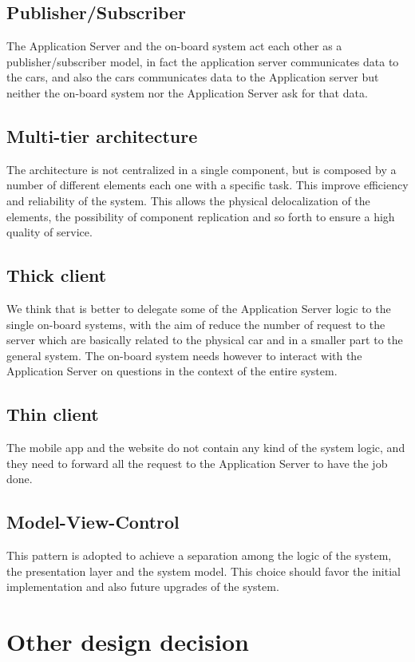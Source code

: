 \documentclass{scrreprt}
\begin{document}
\subsection{Publisher/Subscriber}
The Application Server and the on-board system act each other as a publisher/subscriber model, in fact the application server communicates data to the cars, and also the cars communicates data to the Application server but neither the on-board system nor the Application Server ask for that data.


\subsection{Multi-tier architecture}
The architecture is not centralized in a single component, but is composed by a number of different elements each one with a specific task. This improve efficiency and reliability of the system. This allows the physical delocalization of the elements, the possibility of component replication and so forth to ensure a high quality of service.

\subsection{Thick client}
We think that is better to delegate some of the Application Server logic to the single on-board systems, with the aim of reduce the number of request to the server which are basically related to the physical car and in a smaller part to the general system.
The on-board system needs however to interact with the Application Server on questions in the context of the entire system.

\subsection{Thin client}
The mobile app and the website do not contain any kind of the system logic, and they need to forward all the request to the Application Server to have the job done.

\subsection{Model-View-Control}
This pattern is adopted to achieve a separation among the logic of the system, the presentation layer and the system model. This choice should favor the initial implementation and also future upgrades of the system.

\section{Other design decision}
\end{document}

